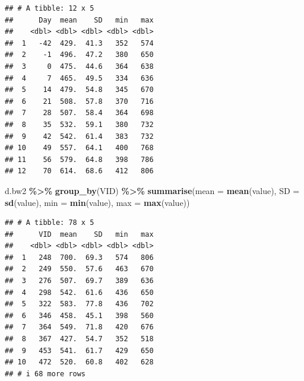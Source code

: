 \documentclass[
]{book}
\newenvironment{Shaded}{\begin{snugshade}}{\end{snugshade}}
\newcommand{\AttributeTok}[1]{\textcolor[rgb]{0.13,0.29,0.53}{#1}}
\newcommand{\CommentTok}[1]{\textcolor[rgb]{0.56,0.35,0.01}{\textit{#1}}}
\newcommand{\DecValTok}[1]{\textcolor[rgb]{0.00,0.00,0.81}{#1}}
\newcommand{\FunctionTok}[1]{\textcolor[rgb]{0.13,0.29,0.53}{\textbf{#1}}}
\newcommand{\NormalTok}[1]{#1}
\newcommand{\OtherTok}[1]{\textcolor[rgb]{0.56,0.35,0.01}{#1}}
\newcommand{\SpecialCharTok}[1]{\textcolor[rgb]{0.81,0.36,0.00}{\textbf{#1}}}
\begin{document}
\begin{verbatim}
## # A tibble: 12 x 5
##      Day  mean    SD   min   max
##    <dbl> <dbl> <dbl> <dbl> <dbl>
##  1   -42  429.  41.3   352   574
##  2    -1  496.  47.2   380   650
##  3     0  475.  44.6   364   638
##  4     7  465.  49.5   334   636
##  5    14  479.  54.8   345   670
##  6    21  508.  57.8   370   716
##  7    28  507.  58.4   364   698
##  8    35  532.  59.1   380   732
##  9    42  542.  61.4   383   732
## 10    49  557.  64.1   400   768
## 11    56  579.  64.8   398   786
## 12    70  614.  68.6   412   806
\end{verbatim}

\begin{Shaded}
\begin{Highlighting}[]
\NormalTok{d.bw2 }\SpecialCharTok{\%\textgreater{}\%} 
  \FunctionTok{group\_by}\NormalTok{(VID) }\SpecialCharTok{\%\textgreater{}\%} 
  \FunctionTok{summarise}\NormalTok{(}\AttributeTok{mean =} \FunctionTok{mean}\NormalTok{(value),}
            \AttributeTok{SD =} \FunctionTok{sd}\NormalTok{(value),}
            \AttributeTok{min =} \FunctionTok{min}\NormalTok{(value),}
            \AttributeTok{max =} \FunctionTok{max}\NormalTok{(value))}
\end{Highlighting}
\end{Shaded}

\begin{verbatim}
## # A tibble: 78 x 5
##      VID  mean    SD   min   max
##    <dbl> <dbl> <dbl> <dbl> <dbl>
##  1   248  700.  69.3   574   806
##  2   249  550.  57.6   463   670
##  3   276  507.  69.7   389   636
##  4   298  542.  61.6   436   650
##  5   322  583.  77.8   436   702
##  6   346  458.  45.1   398   560
##  7   364  549.  71.8   420   676
##  8   367  427.  54.7   352   518
##  9   453  541.  61.7   429   650
## 10   472  520.  60.8   402   628
## # i 68 more rows
\end{verbatim}

\begin{Shaded}
\end{Shaded}
\end{document}
